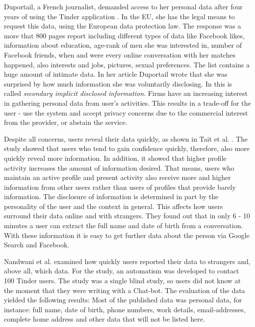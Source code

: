 Duportail, a French journalist, demanded access to her personal data after four years of using the Tinder application \cite{taylor2009privacy}. In the \acs{EU}, she has the legal means to request this data, using the European data protection law. The response was a more that 800 pages report including different types of data like Facebook likes, information about education, age-rank of men she was interested in, number of Facebook friends, when and were every online conversation with her matches happened, also interests and jobs, pictures, sexual preferences. The list contains a huge amount of intimate data. In her article Duportail wrote that she was surprised by how much information she was voluntarily disclosing.
In \cite{taylor2009privacy} this is called \textit{secondary implicit disclosed information}. Firms have an increasing interest in gathering personal data from user's activities. This results in a trade-off for the user - use the system and accept privacy concerns due to the commercial interest from the provider, or abstain the service.

Despite all concerns, users reveal their data quickly, as shown in Tait et al. \cite{tait2015hello}. 
The study showed that users who tend to gain confidence quickly, therefore, also more quickly reveal more information. In addition, it showed that higher profile activity increases the amount of information desired. 
That means, users who maintain an active profile and present activity also receive more and higher information from other users rather than users of profiles that provide barely information. The disclosure of information is determined in part by the personality of the user and the context in general. This affects how users surround their data online and with strangers. They found out that in only 6 - 10 minutes a user can extract the full name and date of birth from a conversation. With these information it is easy to get further data about the person via Google Search and Facebook.

Nandwani et al. \cite{10.1007/978-3-319-61542-4_32} examined how quickly users reported their data to strangers and, above all, which data. For the study, an automatism was developed to contact 100 Tinder users. The study was a single blind study, so users did not know at the moment that they were writing with a Chat-bot. The evaluation of the data yielded the following results: Most of the published data was personal data, for instance: full name, date of birth, phone numbers, work details, email-addresses, complete home address and other data that will not be listed here.

